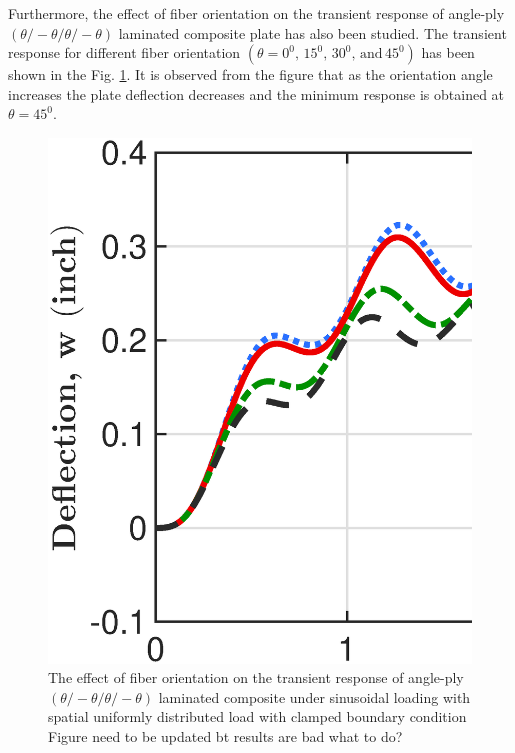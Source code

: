 \documentclass[3p,preprint,12pt]{elsarticle}
\begin{document}
Furthermore, the effect of fiber orientation on the transient response of angle-ply $(\theta/-\theta/\theta/-\theta)$ laminated composite plate has also been studied. The transient response for different fiber orientation $(\theta=0^{0},\,15^{0},\,30^{0},\,\text{and}\,45^{0})$ has been shown in the Fig. \ref{tran_theta_study}. It is observed from the figure that as the orientation angle increases the plate deflection decreases and the minimum response is obtained at $\theta=45^{0}$. 

\begin{figure} 
	\begin{centering}
		\graphicspath{{./All_Images/}}
		\includegraphics[scale=0.3]{4_Layered_Anti_Angle_Ply_Angle.eps}
		\par\end{centering}
	\caption{The effect of fiber orientation on the transient response of angle-ply
		$(\theta/-\theta/\theta/-\theta)$ laminated composite under sinusoidal loading with spatial uniformly distributed load with clamped
		boundary condition{\color{red} Figure need to be updated bt results are bad what to do?}}
	\label{tran_theta_study}
\end{figure}
\end{document}
